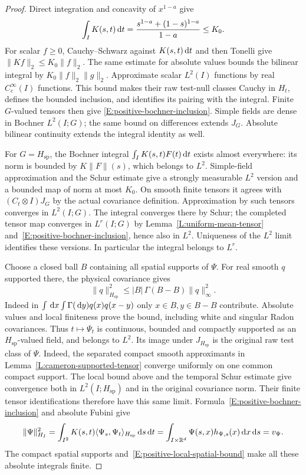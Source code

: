 \begin{proof}
  Direct integration and concavity of $x^{1-a}$ give
  \[
    \int_I K(s,t)\,\mathrm{d} t
    =\frac{s^{1-a}+(1-s)^{1-a}}{1-a}\le K_0 .
  \]
  For scalar $f\ge0$, Cauchy--Schwarz against $K(s,t)\,\mathrm{d} t$ and then
  Tonelli give $\|Kf\|_2\le K_0\|f\|_2$.
  The same estimate for absolute values bounds the bilinear integral
  by $K_0\|f\|_2\|g\|_2$.
  Approximate scalar $L^2(I)$ functions by real $C_c^\infty(I)$
  functions. This bound makes their raw test-null classes Cauchy
  in $H_t$, defines the bounded inclusion, and identifies its pairing
  with the integral. Finite $G$-valued tensors then give
  \eqref{E:positive-bochner-inclusion}. Simple fields are dense in
  Bochner $L^2(I;G)$; the same bound on differences extends $J_G$.
  Absolute bilinear continuity extends the integral identity as well.

  For $G=H_{\mathrm{sp}}$, the Bochner integral
  $\int_IK(s,t)F(t)\,\mathrm{d} t$ exists almost everywhere: its norm is
  bounded by $K\|F\|(s)$, which belongs to $L^2$.
  Simple-field approximation and the Schur estimate give a strongly
  measurable $L^2$ version and a bounded map of norm at most $K_0$.
  On smooth finite tensors it agrees with
  $(C_t\otimes I)J_G$ by the actual covariance definition.
  Approximation by such tensors converges in $L^2(I;G)$.
  The integral converges there by Schur; the completed tensor map
  converges in $L^r(I;G)$ by Lemma~\ref{L:uniform-mean-tensor}
  and~\eqref{E:positive-bochner-inclusion}, hence also in $L^2$.
  Uniqueness of the $L^2$ limit identifies these versions.
  In particular the integral belongs to $L^r$.

  Choose a closed ball $B$ containing all spatial supports of $\Psi$.
  For real smooth $q$ supported there, the physical covariance gives
  \begin{equation}\label{E:positive-local-spatial-bound}
    \|q\|_{H_{\mathrm{sp}}}^2
    \le |B|\,\Gamma(B-B)\|q\|_\infty^2.
  \end{equation}
  Indeed in $\int\,\mathrm{d} x\int\Gamma(\,\mathrm{d} y)q(x)q(x-y)$ only
  $x\in B,y\in B-B$ contribute. Absolute values and local finiteness
  prove the bound, including white and singular Radon covariances.
  Thus $t\mapsto\Psi_t$ is continuous, bounded and compactly supported
  as an $H_{\mathrm{sp}}$-valued field, and belongs to $L^2$.
  Its image under $J_{H_{\mathrm{sp}}}$ is the original raw test class
  of $\Psi$. Indeed, the separated compact smooth approximants in
  Lemma~\ref{L:cameron-supported-tensor} converge uniformly on one common
  compact support. The local bound above and the temporal Schur estimate
  give convergence both in $L^2(I;H_{\mathrm{sp}})$ and in the original
  covariance norm. Their finite tensor identifications therefore have
  this same limit.
  Formula~\eqref{E:positive-bochner-inclusion} and absolute Fubini give
  \[
    \|\Psi\|_{H_I}^2
    =\int_{I^2}K(s,t)\langle\Psi_s,\Psi_t\rangle_{H_{\mathrm{sp}}}
    \,\mathrm{d} s\,\mathrm{d} t
    =\int_{I\times\mathbb{R}^d}\Psi(s,x)h_{\Psi,s}(x)\,\mathrm{d} x\,\mathrm{d} s=v_\Psi.
  \]
  The compact spatial supports and~\eqref{E:positive-local-spatial-bound}
  make all these absolute integrals finite.


\end{proof}
